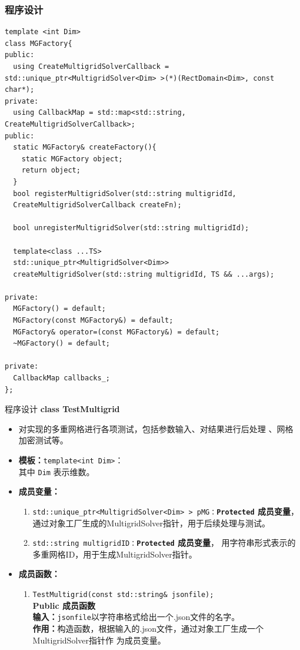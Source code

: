 \documentclass{beamer}
\begin{document}
\begin{frame}[fragile]
  \frametitle{程序设计}
  \tiny
  \begin{lstlisting}
template <int Dim>
class MGFactory{
public:
  using CreateMultigridSolverCallback = std::unique_ptr<MultigridSolver<Dim> >(*)(RectDomain<Dim>, const char*);
private:
  using CallbackMap = std::map<std::string, CreateMultigridSolverCallback>;
public:
  static MGFactory& createFactory(){
    static MGFactory object;
    return object;
  }
  bool registerMultigridSolver(std::string multigridId,
  CreateMultigridSolverCallback createFn);
  
  bool unregisterMultigridSolver(std::string multigridId);
  
  template<class ...TS>
  std::unique_ptr<MultigridSolver<Dim>>
  createMultigridSolver(std::string multigridId, TS && ...args);
  
private:
  MGFactory() = default;
  MGFactory(const MGFactory&) = default;
  MGFactory& operator=(const MGFactory&) = default;
  ~MGFactory() = default;
  
private:
  CallbackMap callbacks_; 
};

  \end{lstlisting}
\end{frame}

\begin{frame}{程序设计}
    \textbf{\large class TestMultigrid}
\begin{itemize}
    \item 对实现的多重网格进行各项测试，包括参数输入、对结果进行后处理
      、网格加密测试等。
        \item \textbf{模板：}\texttt{template<int Dim>}：\\
    其中 \texttt{Dim} 表示维数。
  \item \textbf{成员变量：}
    \begin{enumerate}[(1)]
    \item \texttt{std::unique\_ptr<MultigridSolver<Dim> > pMG：}\textbf{\texttt{Protected}  成员变量}，
      通过对象工厂生成的MultigridSolver指针，用于后续处理与测试。
    \item \texttt{std::string multigridID：}\textbf{\texttt{Protected}  成员变量}，
      用字符串形式表示的多重网格ID，用于生成MultigridSolver指针。
      \end{enumerate}
        \item \textbf{成员函数：}
          \begin{enumerate}[(1)]
                      \item \texttt{TestMultigrid(const std::string\& jsonfile);}\\
          \textbf{Public 成员函数}\\
          \textbf{输入：}\texttt{jsonfile}以字符串格式给出一个$.$json文件的名字。\\
          \textbf{作用：}构造函数，根据输入的$.$json文件，通过对象工厂生成一个MultigridSolver指针作
          为成员变量。
            \end{enumerate}
          \end{itemize}

\end{frame}
\end{document}
